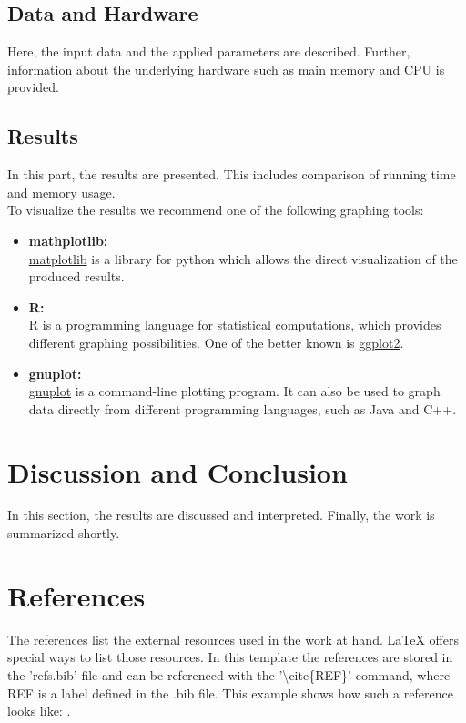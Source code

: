 \documentclass[twocolumn]{article}
\begin{document}
\subsection{Data and Hardware}%
\label{sub:Data and Hardware}
Here, the input data and the applied parameters are described. Further, information about the underlying hardware such as main memory and CPU is provided.

\subsection{Results}%
\label{sub:Results}
In this part, the results are presented. This includes comparison of running time and memory usage.\\
To visualize the results we recommend one of the following graphing tools:
\begin{itemize}
	\item \textbf{mathplotlib:}\\ 
		\href{https://matplotlib.org/}{matplotlib} is a library for python which allows the direct visualization of the produced results.
	\item \textbf{R:}\\
		R is a programming language for statistical computations, which provides different graphing possibilities. One of the better known is \href{https://ggplot2.tidyverse.org/}{ggplot2}.
	\item \textbf{gnuplot:}\\
		\href{http://www.gnuplot.info/}{gnuplot} is a command-line plotting program. It can also be used to graph data directly from different programming languages, such as Java and C++.
\end{itemize}

\section{Discussion and Conclusion}
In this section, the results are discussed and interpreted. Finally, the work is summarized shortly.

\section{References}
The references list the external resources used in the work at hand. \LaTeX$ $  offers special ways to list those resources. In this template the references are stored in the 'refs.bib' file and can be referenced with the '\textbackslash$ $cite\{REF\}' command, where REF is a label defined in the .bib file. This example shows how such a reference looks like: \cite{exa}.



\end{document}
